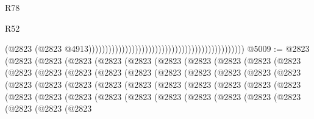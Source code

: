 \begin{lexlean}{R78}
\begin{lexlean}{R52}
\begin{coremodule}
{{{{{{{{{{{{{{{{{{{{{{{{{{{{{{{{{{{{{{{{{{{{{{{{{{{{{{{{{{{{{{{{{{{{{{{{{{{{{{{{{{{{{{{{{{{{{{{{{{{{{{{{{{{{{{{{{{{{{{{{{{{{{{{{{{{{{{{{{{{{{{{{{{{{{{{{{{{{{{{{{{{{{{{{{{{{{{{{{{{{{{{{{{{{{{{{{{{{{{                                                                                              (@2823
                                                                                                (@2823
                                                                                                  @4913)))))))))))))))))))))))))))))))))))))))))))))))
@5009 := @2823
    (@2823
      (@2823
        (@2823
          (@2823
            (@2823
              (@2823
                (@2823
                  (@2823
                    (@2823
                      (@2823
                        (@2823
                          (@2823
                            (@2823
                              (@2823
                                (@2823
                                  (@2823
                                    (@2823
                                      (@2823
                                        (@2823
                                          (@2823
                                            (@2823
                                              (@2823
                                                (@2823
                                                  (@2823
                                                    (@2823
                                                      (@2823
                                                        (@2823
                                                          (@2823
                                                            (@2823
                                                              (@2823
                                                                (@2823
                                                                  (@2823
                                                                    (@2823
                                                                      (@2823
                                                                        (@2823
                                                                          (@2823
                                                                            (@2823
                                                                              (@2823
                                                                                (@2823
                                                                                  (@2823
                                                                                    (@2823
                                                                                      (@2823
                                                                                        (@2823
}}}}}}}}}}}}}}}}}}}}}}}}}}}}}}}}}}}}}}}}}}}}}}}}}}}}}}}}}}}}}}}}}}}}}}}}}}}}}}}}}}}}}}}}}}}}}}}}}}}}}}}}}}}}}}}}}}}}}}}}}}}}}}}}}}}}}}}}}}}}}}}}}}}}}}}}}}}}}}}}}}}}}}}}}}}}}}}}}}}}}}}}}}}}}}}}}}}}}}
\end{coremodule}
\end{lexlean}
\end{lexlean}
